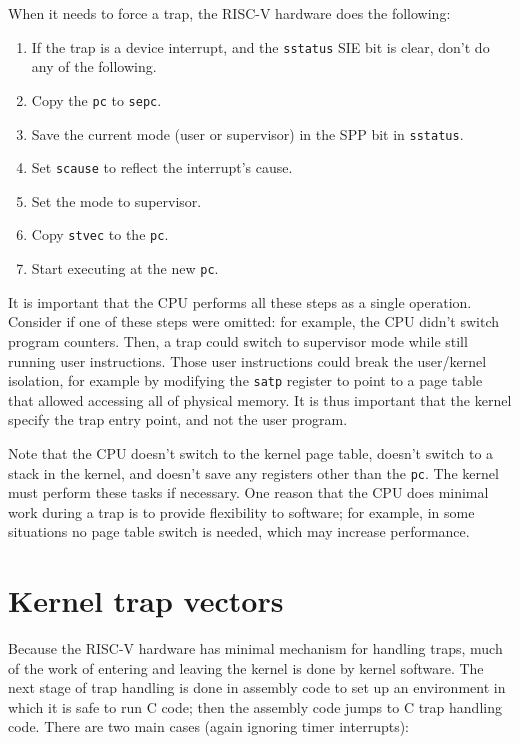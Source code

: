 When it needs to force a trap, the RISC-V hardware does the
following:

\begin{enumerate}

\item If the trap is a device interrupt, and the {\tt sstatus} SIE bit
  is clear, don't do any of the following.

\item Copy the {\tt pc} to {\tt sepc}.

\item Save the current mode (user or supervisor) in the SPP bit in {\tt sstatus}.

\item Set {\tt scause} to reflect the interrupt's cause.

\item Set the mode to supervisor.

\item Copy {\tt stvec} to the {\tt pc}.

\item Start executing at the new {\tt pc}.

\end{enumerate}

It is important that the CPU performs all these steps as
a single operation.
Consider if one of these steps were omitted: for example, the CPU
didn't switch program counters. Then, a trap could switch to
supervisor mode while still running user instructions. Those user
instructions could break the user/kernel isolation, for example by
modifying the {\tt satp} register to point to a page table that
allowed accessing all of physical memory. It is thus important that
the kernel specify the trap entry point, and not the user program.

Note that the CPU doesn't switch to the kernel page table, doesn't
switch to a stack in the kernel, and doesn't save any registers other
than the {\tt pc}. The kernel must perform these tasks if necessary.
One reason that the CPU does minimal work during a trap is to provide
flexibility to software; for example, in some situations no page table
switch is needed, which may increase performance.

\section{Kernel trap vectors}

Because the RISC-V hardware has minimal mechanism for handling traps,
much of the work of entering and leaving the kernel is done by kernel
software. The next stage of trap handling is done in assembly code to
set up an environment in which it is safe to run C code; then the
assembly code jumps to C trap handling code. There are two main cases
(again ignoring timer interrupts):

